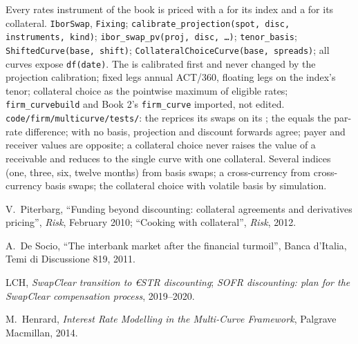 \begin{build}
 Every rates instrument of the book is priced with a  for its index and a  for its collateral.
 \texttt{IborSwap}, \texttt{Fixing};
\texttt{calibrate\_projection(spot, disc, instruments, kind)};
\texttt{ibor\_swap\_pv(proj, disc, \ldots)}; \texttt{tenor\_basis};
\texttt{ShiftedCurve(base, shift)}; \texttt{CollateralChoiceCurve(base,
spreads)}; all curves expose \texttt{df(date)}.
 The  is calibrated first and never changed by the
projection calibration; fixed legs annual ACT/360, floating legs on the
index's tenor; collateral choice as the pointwise maximum of eligible rates;
\texttt{firm\_curvebuild} and Book 2's \texttt{firm\_curve} imported, not edited.
 \texttt{code/firm/multicurve/tests/}: the  reprices its swaps on its ; the  equals the
par-rate difference; with no basis, projection and discount forwards agree;
payer and receiver values are opposite; a collateral choice never raises the
value of a receivable and reduces to the single curve with one collateral.
 Several indices (one, three, six, twelve months) from basis
swaps; a cross-currency  from cross-currency basis swaps; the
collateral choice with volatile basis by simulation.
\end{build}

\begin{omsources}
\item V.\ Piterbarg, ``Funding beyond discounting: collateral agreements and
derivatives pricing'', \emph{Risk}, February 2010; ``Cooking with collateral'',
\emph{Risk}, 2012.
\item A.\ De Socio, ``The interbank market after the financial turmoil'', Banca
d'Italia, Temi di Discussione 819, 2011.
\item LCH, \emph{SwapClear transition to €STR discounting}; \emph{SOFR
discounting: plan for the SwapClear compensation process}, 2019--2020.
\item M.\ Henrard, \emph{Interest Rate Modelling in the Multi-Curve Framework},
Palgrave Macmillan, 2014.
\end{omsources}

